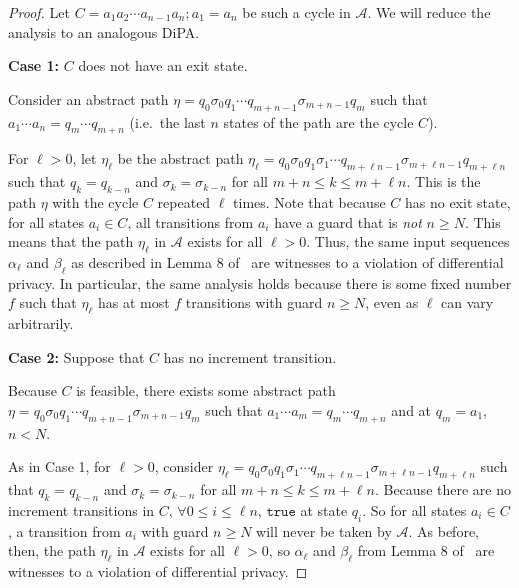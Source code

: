 \documentclass[12pt]{article}
\theoremstyle{definition}
\begin{document}
\begin{proof} 
	
	Let $C = a_1a_2\cdots a_{n-1}a_n; a_1=a_n$ be such a cycle in $\mathcal{A}$. We will reduce the analysis to an analogous DiPA.\@

	\textbf{Case 1:} $C$ does not have an exit state.

	Consider an abstract path $\eta = q_0\sigma_0q_1\cdots q_{m+n-1}\sigma_{m+n-1}q_m$ such that $a_1\cdots a_n=q_m\cdots q_{m+n}$ (i.e.\ the last $n$ states of the path are the cycle $C$). 

	For $\ell > 0$, let $\eta_\ell$ be the abstract path $\eta_\ell = q_0\sigma_0q_1\sigma_1\cdots q_{m+\ell n-1}\sigma_{m+\ell n-1}q_{m+\ell n}$ such that $q_k = q_{k-n}$ and $\sigma_k = \sigma_{k-n}$ for all $m+n\leq k\leq m + \ell n$. This is the path $\eta$ with the cycle $C$ repeated $\ell$ times. 
	Note that because $C$ has no exit state, for all states $a_i\in C$, all transitions from $a_i$ have a guard that is \textit{not} $n\geq N$. This means that the path $\eta_\ell$ in $\mathcal{A}$ exists for all $\ell>0$. 
	Thus, the same input sequences $\alpha_\ell$ and $\beta_\ell$ as described in Lemma 8 of~\cite{chadhaLinearTimeDecidability2021} are witnesses to a violation of differential privacy. In particular, the same analysis holds because there is some fixed number $f$ such that $\eta_\ell$ has at most $f$ transitions with guard $n\geq N$, even as $\ell$ can vary arbitrarily.

	\textbf{Case 2:} Suppose that $C$ has no increment transition.

	Because $C$ is feasible, there exists some abstract path $\eta = q_0\sigma_0q_1\cdots q_{m+n-1}\sigma_{m+n-1}q_m$ such that $a_1\cdots a_m = q_m\cdots q_{m+n}$ and at $q_m = a_1$, $n < N$.

	As in Case 1, for $\ell > 0$, consider $\eta_\ell = q_0\sigma_0q_1\sigma_1\cdots q_{m+\ell n-1}\sigma_{m+\ell n-1}q_{m+\ell n}$ such that $q_k = q_{k-n}$ and $\sigma_k = \sigma_{k-n}$ for all $m+n\leq k\leq m + \ell n$. 
	Because there are no increment transitions in $C$, $\forall 0\leq i\leq \ell n$, $\texttt{true}$ at state $q_i$. So for all states $a_i\in C$, a transition from $a_i$ with guard $n\geq N$ will never be taken by $\mathcal{A}$. As before, then, the path $\eta_\ell$ in $\mathcal{A}$ exists for all $\ell > 0$, so $\alpha_\ell$ and $\beta_\ell$ from Lemma 8 of~\cite{chadhaLinearTimeDecidability2021} are witnesses to a violation of differential privacy.
\end{proof}
\end{document}
